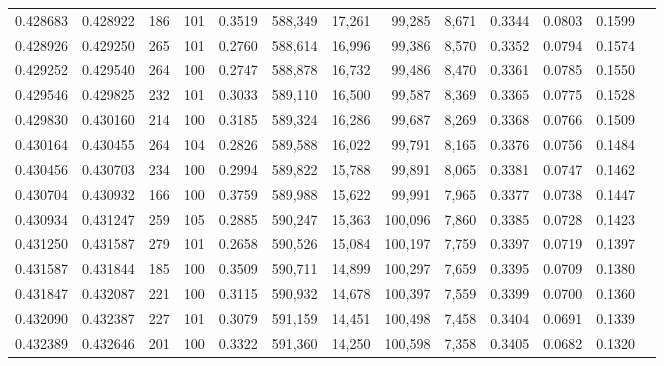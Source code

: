 \begin{tabular}{rrrrrrrrrrrrr}
0.428683 & 0.428922 &   186 & 101 &                                     0.3519 & 588,349 &  17,261 &  99,285 &   8,671 & 0.3344 & 0.0803 & 0.1599 \\
0.428926 & 0.429250 &   265 & 101 &                                     0.2760 & 588,614 &  16,996 &  99,386 &   8,570 & 0.3352 & 0.0794 & 0.1574 \\
0.429252 & 0.429540 &   264 & 100 &                                     0.2747 & 588,878 &  16,732 &  99,486 &   8,470 & 0.3361 & 0.0785 & 0.1550 \\
0.429546 & 0.429825 &   232 & 101 &                                     0.3033 & 589,110 &  16,500 &  99,587 &   8,369 & 0.3365 & 0.0775 & 0.1528 \\
0.429830 & 0.430160 &   214 & 100 &                                     0.3185 & 589,324 &  16,286 &  99,687 &   8,269 & 0.3368 & 0.0766 & 0.1509 \\
0.430164 & 0.430455 &   264 & 104 &                                     0.2826 & 589,588 &  16,022 &  99,791 &   8,165 & 0.3376 & 0.0756 & 0.1484 \\
0.430456 & 0.430703 &   234 & 100 &                                     0.2994 & 589,822 &  15,788 &  99,891 &   8,065 & 0.3381 & 0.0747 & 0.1462 \\
0.430704 & 0.430932 &   166 & 100 &                                     0.3759 & 589,988 &  15,622 &  99,991 &   7,965 & 0.3377 & 0.0738 & 0.1447 \\
0.430934 & 0.431247 &   259 & 105 &                                     0.2885 & 590,247 &  15,363 & 100,096 &   7,860 & 0.3385 & 0.0728 & 0.1423 \\
0.431250 & 0.431587 &   279 & 101 &                                     0.2658 & 590,526 &  15,084 & 100,197 &   7,759 & 0.3397 & 0.0719 & 0.1397 \\
0.431587 & 0.431844 &   185 & 100 &                                     0.3509 & 590,711 &  14,899 & 100,297 &   7,659 & 0.3395 & 0.0709 & 0.1380 \\
0.431847 & 0.432087 &   221 & 100 &                                     0.3115 & 590,932 &  14,678 & 100,397 &   7,559 & 0.3399 & 0.0700 & 0.1360 \\
0.432090 & 0.432387 &   227 & 101 &                                     0.3079 & 591,159 &  14,451 & 100,498 &   7,458 & 0.3404 & 0.0691 & 0.1339 \\
0.432389 & 0.432646 &   201 & 100 &                                     0.3322 & 591,360 &  14,250 & 100,598 &   7,358 & 0.3405 & 0.0682 & 0.1320 \\

\end{tabular}
